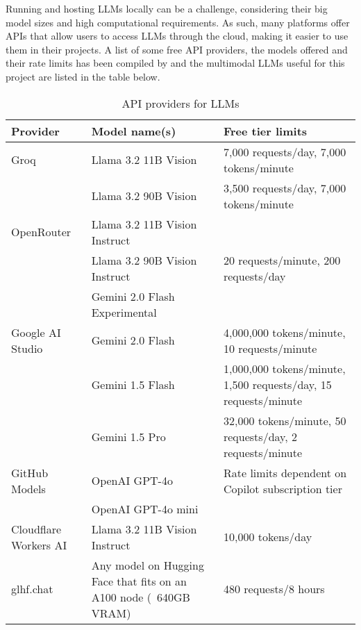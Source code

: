 Running and hosting LLMs locally can be a challenge, considering their big model sizes and high computational requirements. As such, many platforms offer APIs that allow users to access LLMs through the cloud, making it easier to use them in their projects. A list of some free API providers, the models offered and their rate limits has been compiled by \textcite{llmapi} and the multimodal LLMs useful for this project are listed in the table below.

\begin{table}[h!]
    \centering
    \begin{tabular}{p{2cm} p{5cm} p{6cm}}
        \toprule
        \textbf{Provider} & \textbf{Model name(s)} & \textbf{Free tier limits} \\
        \midrule
        \raggedright
        Groq & Llama 3.2 11B Vision & 7,000 requests/day, 7,000 tokens/minute \\
        & Llama 3.2 90B Vision & 3,500 requests/day, 7,000 tokens/minute \\
        \hline
        \raggedright
        OpenRouter & Llama 3.2 11B Vision Instruct &  \\
        & Llama 3.2 90B Vision Instruct & 20 requests/minute, 200 requests/day \\
        & Gemini 2.0 Flash Experimental &  \\
        \hline
        \raggedright
        Google AI Studio & Gemini 2.0 Flash & 4,000,000 tokens/minute, 10 requests/minute \\
        & Gemini 1.5 Flash & 1,000,000 tokens/minute, 1,500 requests/day, 15 requests/minute \\
        & Gemini 1.5 Pro & 32,000 tokens/minute, 50 requests/day, 2 requests/minute \\
        \hline
        \raggedright
        GitHub Models & OpenAI GPT-4o & Rate limits dependent on Copilot subscription tier \\
        & OpenAI GPT-4o mini & \\
        \hline
        \raggedright
        Cloudflare Workers AI & Llama 3.2 11B Vision Instruct & 10,000 tokens/day \\
        \hline
        \raggedright
        glhf.chat & Any model on Hugging Face that fits on an A100 node (~640GB VRAM)& 480 requests/8 hours \\
        \bottomrule
    \end{tabular}
    \caption{API providers for LLMs}
    \label{tab:llm_apis}
\end{table}

